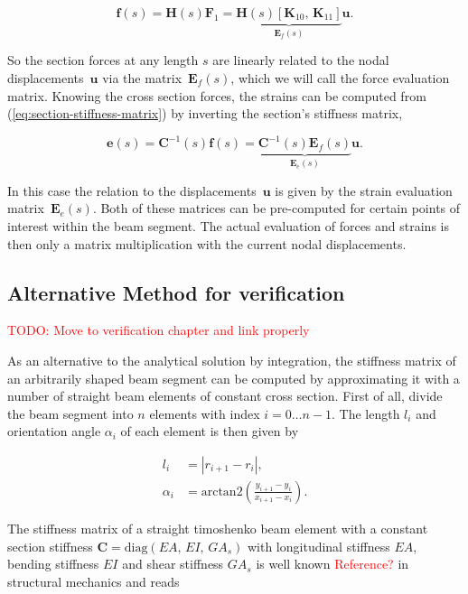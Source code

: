 \begin{equation}
\boldsymbol{f}(s) = \boldsymbol{H}(s)\boldsymbol{F}_{1} = \underbrace{\boldsymbol{H}(s)\left[\boldsymbol{K}_{10},\,\boldsymbol{K}_{11}\right]}_{\boldsymbol{E}_f(s)}\boldsymbol{u}.
\end{equation}

So the section forces at any length $s$ are linearly related to the nodal displacements~$\boldsymbol{u}$ via the matrix~$\boldsymbol{E}_f(s)$, which we will call the force evaluation matrix.
Knowing the cross section forces, the strains can be computed from (\ref{eq:section-stiffness-matrix}) by inverting the section's stiffness matrix,

\begin{equation}
\boldsymbol{e}(s) = \boldsymbol{C}^{-1}(s)\boldsymbol{f}(s) = \underbrace{\boldsymbol{C}^{-1}(s)\boldsymbol{E}_f(s)}_{\boldsymbol{E}_e(s)}\boldsymbol{u}.
\end{equation}

In this case the relation to the displacements~$\boldsymbol{u}$ is given by the strain evaluation matrix~$\boldsymbol{E}_e(s)$.
Both of these matrices can be pre-computed for certain points of interest within the beam segment.
The actual evaluation of forces and strains is then only a matrix multiplication with the current nodal displacements.

\newpage
\subsection*{Alternative Method for verification}

\textcolor{red}{TODO: Move to verification chapter and link properly}

As an alternative to the analytical solution by integration, the stiffness matrix of an arbitrarily shaped beam segment can be computed by approximating it with a number of straight beam elements of constant cross section.
First of all, divide the beam segment into $n$ elements with index $i = 0 \ldots n-1$.
The length $l_i$ and orientation angle $\alpha_i$ of each element is then given by

\begin{align}
l_{i} &= \left| r_{i+1} - r_{i} \right|, \\
\alpha_i &= \mathrm{arctan2}\left(\frac{y_{i+1} - y_{i}}{x_{i+1} - x_{i}}\right).
\end{align}

The stiffness matrix of a straight timoshenko beam element with a constant section stiffness $\boldsymbol{C} = \mathrm{diag}(EA,\,EI,\,GA_s)$ with longitudinal stiffness $EA$, bending stiffness $EI$ and shear stiffness $GA_s$ is well known \textcolor{red}{Reference?} in structural mechanics and reads

